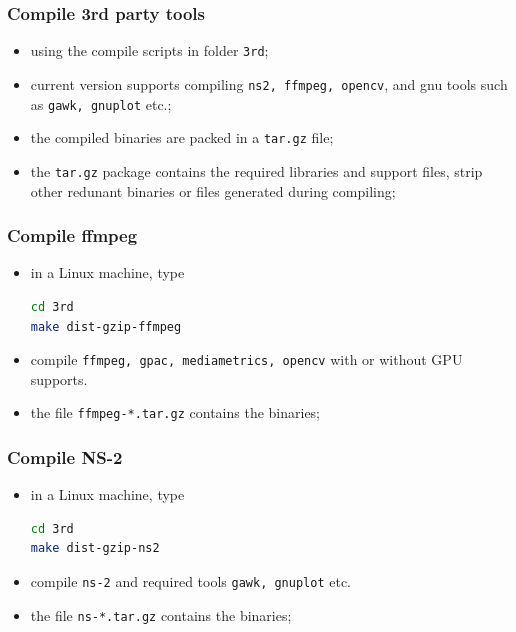 \documentclass{beamer}
\theoremstyle{definition}
\theoremstyle{remark}
\begin{document}
\begin{frame}[fragile]
  \frametitle<presentation>{Compile 3rd party tools}

    \begin{itemize}
      \item using the compile scripts in folder \texttt{3rd};
      \item current version supports compiling \texttt{ns2, ffmpeg, opencv}, and gnu tools such as \texttt{gawk, gnuplot} etc.;
      \item the compiled binaries are packed in a \texttt{tar.gz} file;
      \item the \texttt{tar.gz} package contains the required libraries and support files, strip other redunant binaries or files generated during compiling;
    \end{itemize}

\end{frame}




\begin{frame}[fragile]
  \frametitle<presentation>{Compile ffmpeg}

    \begin{itemize}
      \item in a Linux machine, type
\begin{lstlisting}[language=bash]
cd 3rd
make dist-gzip-ffmpeg
\end{lstlisting}
      \item compile \texttt{ffmpeg, gpac, mediametrics, opencv} with or without GPU supports.
      \item the file \texttt{ffmpeg-*.tar.gz} contains the binaries;
    \end{itemize}

\end{frame}



\begin{frame}[fragile]
  \frametitle<presentation>{Compile NS-2}

    \begin{itemize}
      \item in a Linux machine, type
\begin{lstlisting}[language=bash]
cd 3rd
make dist-gzip-ns2
\end{lstlisting}
      \item compile \texttt{ns-2} and required tools \texttt{gawk, gnuplot} etc.
      \item the file \texttt{ns-*.tar.gz} contains the binaries;
    \end{itemize}

\end{frame}
\end{document}
